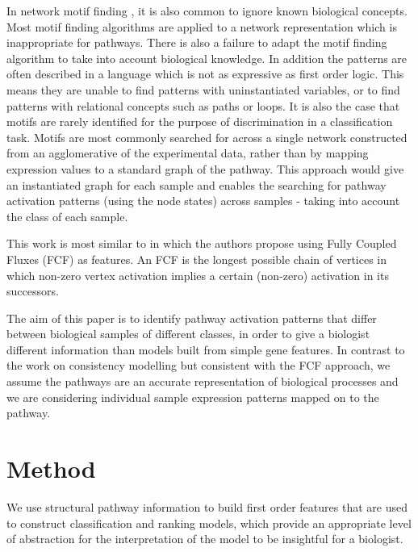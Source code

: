 \documentclass[runningheads,a4paper]{llncs}
\begin{document}
In network motif finding \citep{kim_biological_2011}, it is also common to ignore known biological concepts. Most motif finding algorithms are applied to a network representation which is inappropriate for pathways. There is also a failure to adapt the motif finding algorithm to take into account biological knowledge. In addition the patterns are often described in a language which is not as expressive as first order logic. This means they are unable to find patterns with uninstantiated variables, or to find patterns with relational concepts such as paths or loops. It is also the case that motifs are rarely identified for the purpose of discrimination in a classification task. Motifs are most commonly searched for across a single network constructed from an agglomerative of the experimental data, rather than by mapping expression values to a standard graph of the pathway. This approach would give an instantiated graph for each sample and enables the searching for pathway activation patterns (using the node states) across samples - taking into account the class of each sample. 

This work is most similar to  \citep{holec2008using} in which the authors propose using Fully Coupled Fluxes (FCF) as features. An FCF is the longest possible chain of vertices in which non-zero vertex activation implies a certain (non-zero) activation in its successors.

The aim of this paper is to identify pathway activation patterns that differ between biological samples of different classes, in order to give a biologist different information than models built from simple gene features. In contrast to the work on consistency modelling but consistent with the FCF approach, we assume the pathways are an accurate representation of biological processes and we are considering individual sample expression patterns mapped on to the pathway. 


%

	  
\section{Method}
 We use structural pathway information to build first order features that are used to construct classification and ranking models, which  provide an appropriate level of abstraction for the interpretation of the model to be insightful for a biologist. 
\end{document}
